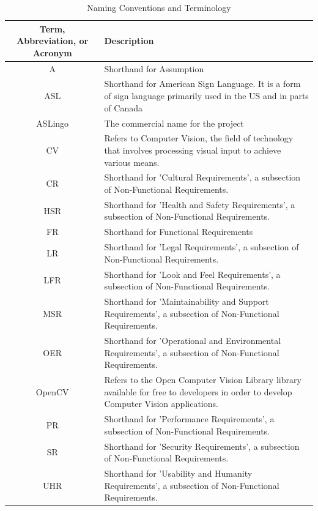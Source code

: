 \documentclass[12pt, titlepage]{article}
\begin{document}
\begin{longtable}{| c | p{7cm} |}
\caption{Naming Conventions and Terminology} \\
\hline
\textbf{Term, Abbreviation, or Acronym} & \textbf{Description}\\
\hline
A & Shorthand for Assumption\\
\hline
ASL & Shorthand for American Sign Language. It is a form of sign language primarily used in the US and in parts of Canada\\
\hline
ASLingo & The commercial name for the project\\
\hline
CV & Refers to Computer Vision, the field of technology that involves processing visual input to achieve various means.\\
\hline
CR & Shorthand for 'Cultural Requirements', a subsection of Non-Functional Requirements.\\
\hline
HSR & Shorthand for 'Health and Safety Requirements', a subsection of Non-Functional Requirements.\\
\hline
FR & Shorthand for Functional Requirements\\
\hline
LR & Shorthand for 'Legal Requirements', a subsection of Non-Functional Requirements.\\
\hline
LFR & Shorthand for 'Look and Feel Requirements', a subsection of Non-Functional Requirements.\\
\hline
MSR & Shorthand for 'Maintainability and Support Requirements', a subsection of Non-Functional Requirements.\\
\hline
OER & Shorthand for 'Operational and Environmental Requirements', a subsection of Non-Functional Requirements.\\
\hline
OpenCV & Refers to the Open Computer Vision Library library available for free to developers in order to develop Computer Vision applications.\\
\hline
PR & Shorthand for 'Performance Requirements', a subsection of Non-Functional Requirements.\\
\hline
SR & Shorthand for 'Security Requirements', a subsection of Non-Functional Requirements.\\
\hline
UHR & Shorthand for 'Usability and Humanity Requirements', a subsection of Non-Functional Requirements.\\
\bottomrule
\end{longtable}

\newpage

\tableofcontents
\end{document}
